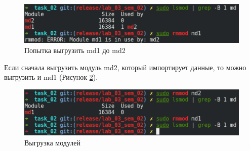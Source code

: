 \begin{figure}[H]
    \centering
    \includegraphics[scale=0.8]{img/part_02/incorrect_rmmod.png}
    \caption{Попытка выгрузить md1 до md2}
    \label{img:incorrect_rmmod}
\end{figure}

Если сначала выгрузить модуль md2, который импортирует данные, то можно выгрузить и md1 (Рисунок \ref{img:rmmod}).

\begin{figure}[H]
    \centering
    \includegraphics[scale=0.8]{img/part_02/rmmod.png}
    \caption{Выгрузка модулей}
    \label{img:rmmod}
\end{figure}
